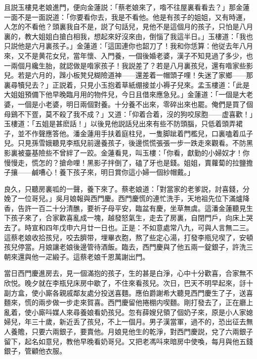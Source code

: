 且説玉樓見老娘進門，便向金蓮説：「蔡老娘來了，喒不往屋裏看看去？」那金蓮一面不是一面説道：「你要看你去，我是不看他。他是有孩子的姐姐，又有時運，人怎的不看他？頭裏我自不是，説了句話兒，見他不是這個月的孩子，只怕是八月裏的，教大姐姐白搶白相我，想起來好沒來由，倒惱了我這半日。」玉樓道：「我也只説他是六月裏孩子。」金蓮道：「這囬連你也韶刀了！我和你恁算：他従去年八月來，又不是黄花女兒，當年懷、入門養，一個後婚老婆，漢子不知見過了多少，也一兩個月纔生胎，就認做是喒家孩子！我説差了？若是八月裏孩兒，還有喒家些影兒。若是六月的，䠕小板凳兒糊險道神——還差着一帽頭子哩！失迷了家鄉——那裏尋犢兒去？」正説着，只見小玉抱着草紙绷接並小褥子兒來。孟玉樓道：「此是大姐姐預備下他早晚臨月用的物件兒，今日且借來應急兒。」金蓮道：「一個是大老婆，一個是小老婆，明日兩個對養。十分養不出來，零碎出來也罷。俺們是買了個母鷄不下疍，莫不殺了我不成？」又道：「仰着合着，沒的狗咬尿胞——虚喜歡！」玉樓道：「五姐是甚麽話！」以後見他説話兒出來有些不防頭腦，只低着頭弄裙子，並不作聲應答他。潘金蓮用手扶着庭柱兒，一隻脚跐着門檻兒，口裏嗑着瓜子兒。只見孫雪娥聽見李瓶兒前邊養孩子，後邊慌慌張張一步一跌走來觀看。不防黑影裏被臺基險些不曾絆了一跤。金蓮看見，叫玉樓：「你看，獻勤的小婦奴才！你慢慢走，慌怎的？搶命哩！黑影子拌倒了，磕了牙也是錢。姐姐，賣蘿蔔的拉鹽擔子攘——鹹嘈心！養下孩子來，明日賞你這小婦一個紗帽戴。」

良久，只聽房裏呱的一聲，養下來了。蔡老娘道：「對當家的老爹説，討喜錢，分娩了一位哥兒。」吳月娘報與西門慶。西門慶慌的連忙洗手，天地祖先位下滿爐降香，告許一百二十分清醮，要祈子母平安，臨盆有慶，坐草無虞。這潘金蓮聽見生下孩子來了，合家歡喜亂成一塊，越發怒氣生，走去了房裏，自閉門戶，向床上哭去了。時宣和四年戊申六月廿一日也。正是：不如意處常八九，可與人言無二三。這蔡老娘收拾孩兒，咬去臍带，埋畢衣胞，熬了些定心湯，打發李瓶兒喫了，安頓孩兒停當。月娘讓老娘後邊管待酒飯。臨去，西門慶與了他五兩一錠銀子，許洗三朝來還與他一疋緞子。這蔡老娘千恩萬謝出門。

當日西門慶進房去，見一個滿抱的孩子，生的甚是白淨，心中十分歡喜，合家無不欣悦。晚夕就在李瓶兒床房中歇了，不住來看孩兒。次日，巴天不明早起來，㧱十副方盒，使小廝各親戚鄰友處分投送喜麵。應伯爵謝希大聽見西門慶生了子，送喜麵來，慌的兩步做一步走來賀喜。西門慶留他捲棚内喫麵。剛打發去了，正在廳上亂着，使小廝呌媒人來尋養娘看奶孩兒。忽有薛嫂兒領了個奶子來，原是小人家媳婦兒，年三十歲，新近丢了孩兒，不上一個月。男子漢當軍，過不的，恐出征去無人養贍，只要六兩銀子，要賣他。月娘見他生的乾淨，對西門慶説，兌了六兩銀子留下，起名如意兒，教他早晚看奶哥兒。又把老馮呌來暗房中使喚，每月與他五錢銀子，管顧他衣服。


